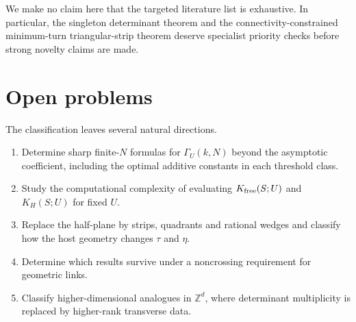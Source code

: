 \documentclass[11pt]{article}
\theoremstyle{definition}
\newcommand{\Z}{\mathbb Z}
\begin{document}
We make no claim here that the targeted literature list is exhaustive.  In particular, the singleton determinant theorem and the connectivity-constrained minimum-turn triangular-strip theorem deserve specialist priority checks before strong novelty claims are made.

\section{Open problems}\label{sec:open}
The classification leaves several natural directions.
\begin{enumerate}[label=(O\arabic*)]
\item Determine sharp finite-$N$ formulas for $\Gamma_U(k,N)$ beyond the asymptotic coefficient, including the optimal additive constants in each threshold class.
\item Study the computational complexity of evaluating $K_{\rm free}(S;U)$ and $K_H(S;U)$ for fixed $U$.
\item Replace the half-plane by strips, quadrants and rational wedges and classify how the host geometry changes $\tau$ and $\eta$.
\item Determine which results survive under a noncrossing requirement for geometric links.
\item Classify higher-dimensional analogues in $\Z^d$, where determinant multiplicity is replaced by higher-rank transverse data.
\end{enumerate}

\appendix
\end{document}
